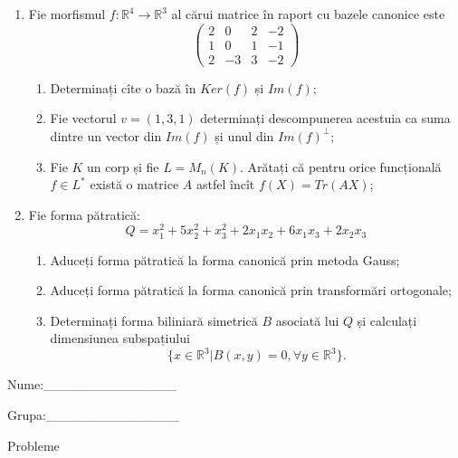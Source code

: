 \documentclass{article}
\begin{document}
\begin{enumerate}
 \item Fie morfismul $f:\mathbb{R}^4 \to \mathbb{R}^3$ al cărui matrice în raport cu bazele canonice este
$$\begin{pmatrix}
2&0&2&-2\\
1&0&1&-1\\
2&-3&3&-2
\end{pmatrix}$$

\begin{enumerate}
\item Determinați cîte o bază în $Ker(f)$ și $Im(f)$;
\item Fie vectorul $v=(1,3,1)$ determinați descompunerea acestuia ca suma dintre un vector din $Im(f)$ și unul din $Im(f)^\perp$;
\item Fie $K$ un corp și fie $L=M_n(K)$. Arătați că pentru orice funcțională $f \in L^*$ există o matrice $A$ astfel încît $f(X)=Tr(AX)$;
\end{enumerate}
\item Fie forma pătratică:
$$Q= x_1^2+5x_2^2+x_3^2+2x_1x_2+6x_1x_3+2x_2x_3$$

\begin{enumerate}
\item Aduceți forma pătratică la forma canonică prin metoda Gauss;
\item Aduceți forma pătratică la forma canonică prin transformări ortogonale;
\item Determinați forma biliniară simetrică $B$ asociată lui $Q$ și calculați dimensiunea subspațiului
$$\{x \in \mathbb{R}^3 | B(x,y)=0,\forall y \in \mathbb{R}^3\}.$$

\end{enumerate}
\end{enumerate}
\newpage
\begin{flushright}
Nume:\_\_\_\_\_\_\_\_\_\_\_\_\_\_
 
 
Grupa:\_\_\_\_\_\_\_\_\_\_\_\_\_\_
\end{flushright}
\begin{center}
\vspace{2cm}
{\Large Probleme}
\vspace{2cm}
\end{center}
\end{document}
